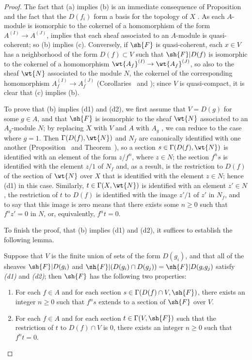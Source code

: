 \begin{proof}
\label{proof-1.1.4.1}
The fact that (a) implies (b) is an immediate consequence of Proposition~ and the fact that the $D(f_i)$ form a basis for the topology of $X$ .
As each $A$-module is isomorphic to the cokernel of a homomorphism of the form $A^{(I)}\to A^{(J)}$,  implies that each sheaf associated to an $A$-module is quasi-coherent;
so (b) implies (c).
Conversely, if $\sh{F}$ is quasi-coherent, each $x\in V$ has a neighborhood of the form $D(f)\subset V$ such that $\sh{F}|D(f)$ is isomorphic to the cokernel of a homomorphism $\wt{A_f}^{(I)}\to\wt{A_f}^{(J)}$, so also to the sheaf $\wt{N}$ associated to the module $N$, the cokernel of the corresponding homomorphism
$A_f^{(I)}\to A_f^{(J)}$ (Corollaries~ and );
since $V$ is quasi-compact, it is clear that (c) implies (b).

To prove that (b) implies (d1) and (d2), we first assume that $V=D(g)$ for some $g\in A$, and that $\sh{F}$ is isomorphic to the sheaf $\wt{N}$ associated to an $A_g$-module $N$;
by replacing $X$ with $V$ and $A$ with $A_g$ , we can reduce to the case where $g=1$.
Then $\Gamma(D(f),\wt{N})$ and $N_f$ are canonically identified with one another (Proposition~ and Theorem~), so a section $s\in\Gamma(D(f),\wt{N})$ is identified with an element of the form $z/f^n$, where $z\in N$;
the section $f^n s$ is identified with the element $z/1$ of $N_f$ and, as a result, is the restriction to $D(f)$ of the section of $\wt{N}$ over $X$ that is identified with the element $z\in N$;
hence (d1) in this case.
Similarly, $t\in\Gamma(X,\wt{N})$ is identified with an element $z'\in N$, the restriction of $t$ to $D(f)$ is identified with the image $z'/1$ of $z'$ in $N_f$, and to say that this image is zero means that there exists some $n\geq 0$ such that $f^n z'=0$ in $N$, or, equivalently, $f^n t=0$.

To finish the proof, that (b) implies (d1) and (d2), it suffices to establish the following lemma.
\begin{lem}[1.4.1.1]
\label{1.1.4.1.1}
Suppose that $V$ is the finite union of sets of the form $D(g_i)$, and that all of the sheaves $\sh{F}|D(g_i)$ and $\sh{F}|(D(g_i)\cap D(g_j))=\sh{F}|D(g_i g_j)$ satisfy \emph{(d1)} and \emph{(d2)};
then $\sh{F}$ has the following two properties:
\begin{enumerate}[label=\emph{(d$'$\arabic*)}]
  \item For each $f\in A$ and for each section $s\in\Gamma(D(f)\cap V,\sh{F})$, there exists an integer $n\geq 0$ such that $f^n s$ extends to a section of $\sh{F}$ over $V$.
  \item For each $f\in A$ and for each section $t\in\Gamma(V,\sh{F})$ such that the restriction of $t$ to $D(f)\cap V$ is $0$, there exists an integer $n\geq 0$ such that $f^n t=0$.
\end{enumerate}
\end{lem}


\end{proof}

